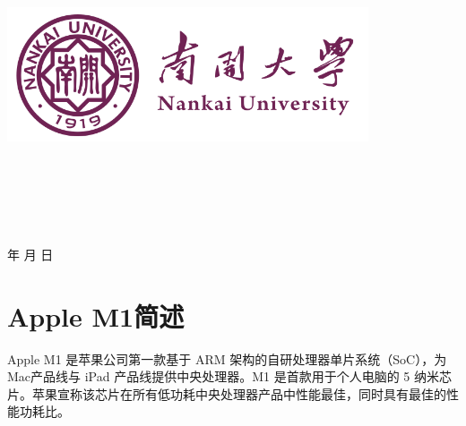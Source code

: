 \documentclass[a4paper]{article}
\newcommand{\HRule}{\rule{\linewidth}{0.5mm}}%
\begin{document}
\renewcommand{\contentsname}{目\ 录}
\renewcommand{\appendixname}{附录}
\renewcommand{\appendixpagename}{附录}
\renewcommand{\refname}{参考文献}
\renewcommand{\figurename}{图}
\renewcommand{\tablename}{表}
\renewcommand{\today}{\number\year 年 \number\month 月 \number\day 日}

\begin{titlepage}
  \begin{center}
    \includegraphics[width=0.8\textwidth]{NKU.png}\\[1cm]
    \vspace{20mm}
    \textbf{\huge\textbf{}}\\[0.5cm]
    \textbf{\huge{}}\\[2.3cm]
    \textbf{\Huge\textbf{}}

    \vspace{\fill}

    \centering
    \textsc{\LARGE {}}\\[0.5cm]
    \textsc{\LARGE {}}\\[0.5cm]
    \textsc{\LARGE {}}\\[0.5cm]

    \vfill
    {\Large \today}
  \end{center}
\end{titlepage}

\renewcommand {\thefigure}{\thesection{}.\arabic{figure}}%
\renewcommand{\figurename}{图}
\renewcommand{\contentsname}{目录}


\clearpage
\tableofcontents
\newpage

\section{Apple M1简述}
Apple M1 是苹果公司第一款基于 ARM 架构的自研处理器单片系统（SoC），为Mac产品线与 iPad 产品线提供中央处理器。M1 是首款用于个人电脑的 5 纳米芯片。苹果宣称该芯片在所有低功耗中央处理器产品中性能最佳，同时具有最佳的性能功耗比。
\end{document}
